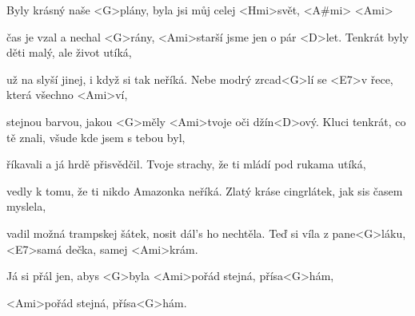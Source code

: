 
\zs
Byly krásný naše <G>plány,
{byla} jsi můj celej <Hmi>svět, <A#mi> <Ami>

čas je vzal a nechal <G>rány,
<Ami>starší jsme jen o pár <D>let.
\ks
\zs
Tenkrát byly děti malý, ale život utíká,

už na  slyší jinej, i když si tak neříká.
\ks
\zr
Nebe modrý zrcad<G>lí se <E7>v řece, která všechno <Ami>ví,

stejnou barvou, jakou <G>měly <Ami>tvoje oči džín<D>ový.
\kr
\zs
Kluci tenkrát, co tě znali, všude kde jsem s tebou byl,

 říkavali a já hrdě přisvědčil.
\ks
\zs
Tvoje strachy, že ti mládí pod rukama utíká,

vedly k tomu, že ti nikdo Amazonka neříká.
\ks
\zr \kr
\zs
Zlatý kráse cingrlátek,
jak sis časem myslela,

vadil možná trampskej šátek,
nosit dál's ho nechtěla.
\ks
\zs
Teď si víla z pane<G>láku, <E7>samá dečka, samej <Ami>krám.

Já si přál jen, abys <G>byla <Ami>pořád stejná, přísa<G>hám,

<Ami>pořád stejná, přísa<G>hám.
\ks
\zr \kr
\kp







